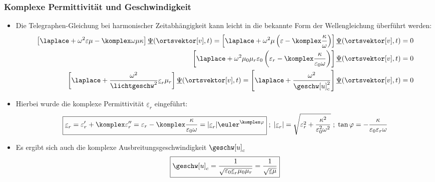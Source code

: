 \begin{frame}
  \frametitle{Komplexe Permittivität und Geschwindigkeit}
  \begin{itemize}[<+->]
  \item Die Telegraphen-Gleichung bei harmonischer Zeitabhängigkeit kann leicht in die bekannte Form der Wellengleichung überführt werden:
    \begin{align*}
      \left[ \laplace + \omega^2\varepsilon\mu - \komplex\omega\mu\kappa \right] \underline{\Psi}(\ortsvektor[v], t) =\left[ \laplace + \omega^2\mu\left(\varepsilon - \komplex\frac{\kappa}{\omega}\right) \right] \underline{\Psi}(\ortsvektor[v], t) &=0\\
       \left[ \laplace + \omega^2\mu_0\mu_r\varepsilon_0\left(\varepsilon_r - \komplex\frac{\kappa}{\varepsilon_0\omega}\right) \right] \underline{\Psi}(\ortsvektor[v], t) &=0\\
       \left[ \laplace + \frac{\omega^2}{\lichtgeschw^2}\underline{\varepsilon}_r\mu_r\right] \underline{\Psi}(\ortsvektor[v], t) = \left[ \laplace + \frac{\omega^2}{\geschw[u]_c^2}\right] \underline{\Psi}(\ortsvektor[v], t)&=0
    \end{align*}
  \item Hierbei wurde die \alert{komplexe Permittivität} \(\underline{\varepsilon}_r\) eingeführt:
    \begin{equation*}
      \boxed{\underline{\varepsilon}_r = \varepsilon_r^{\prime} + \komplex \varepsilon_r^{\prime\prime} = \varepsilon_r - \komplex\frac{\kappa}{\varepsilon_0\omega} = |\underline{\varepsilon}_r| \euler^{\komplex\varphi}} \; ;\; |\underline{\varepsilon}_r|=\sqrt{\varepsilon_r^2+\frac{\kappa^2}{\varepsilon_0^2\omega^2}} \; ; \; \tan\varphi = -\frac{\kappa}{\varepsilon_0\varepsilon_r\omega}  
    \end{equation*}
  \item Es ergibt sich auch die \alert{komplexe Ausbreitungsgeschwindigkeit} \(\geschw[u]_c\)
    \begin{equation*}
    \boxed{\geschw[u]_c = \frac{1}{\sqrt{\varepsilon_0\underline{\varepsilon}_r\mu_0\mu_r}} = \frac{1}{\sqrt{\underline{\varepsilon}\mu}}}
    \end{equation*}
    \end{itemize}
  \end{frame}

